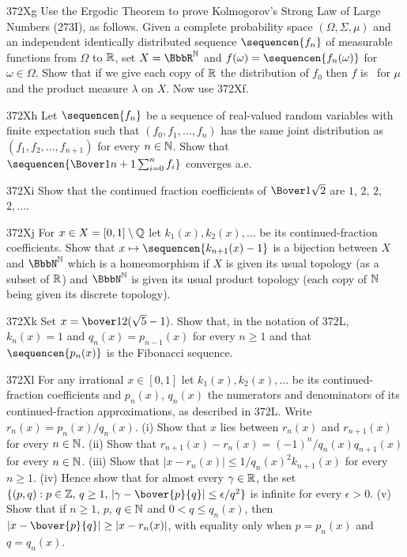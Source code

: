 {\sqheader 372Xg Use the Ergodic Theorem to prove Kolmogorov's Strong Law
of Large Numbers (273I), as follows.   Given a complete probability
space $(\Omega,\Sigma,\mu)$ and an independent identically distributed
sequence $\sequencen{f_n}$ of measurable functions from $\Omega$ to
$\Bbb R$, set $X=\BbbR^{\Bbb N}$ and
$f(\omega)=\sequencen{f_n(\omega)}$ for $\omega\in\Omega$.   Show that
if we give each copy of $\Bbb R$ the distribution of $f_0$ then $f$ is
\imp\ for $\mu$ and the product measure $\lambda$ on $X$.   Now use
372Xf.

\sqheader 372Xh Let
$\sequencen{f_n}$ be a sequence of real-valued random variables with finite
expectation such that
$(f_0,f_1,\ldots,f_n)$ has the same joint distribution as
$(f_1,f_2,\ldots,f_{n+1})$ for every $n\in\Bbb N$.   Show that
$\sequencen{\Bover1{n+1}\sum_{i=0}^nf_i}$ converges a.e.   

\spheader 372Xi Show that the continued fraction coefficients of
$\Bover1{\sqrt 2}$ are $1$, $2$, $2$, $2,\ldots$.

\sqheader 372Xj For $x\in X=[0,1]\setminus\Bbb Q$ let
$k_1(x),k_2(x),\ldots$ be its continued-fraction coefficients.
Show that $x\mapsto\sequencen{k_{n+1}(x)-1}$ is a bijection between $X$
and $\BbbN^{\Bbb N}$ which is a homeomorphism if $X$ is given its usual
topology (as a subset of $\Bbb R$) and $\BbbN^{\Bbb N}$ is given its
usual product topology (each copy of $\Bbb N$ being given its discrete
topology).

\spheader 372Xk Set $x=\bover12(\sqrt5-1)$.
Show that, in the notation of 372L, $k_n(x)=1$ and
$q_n(x)=p_{n-1}(x)$ for every $n\ge 1$ and that $\sequencen{p_n(x)}$ is the
Fibonacci sequence.

\spheader 372Xl For any irrational $x\in[0,1]$ let
$k_1(x),k_2(x),\ldots$ be its continued-fraction coefficients and
$p_n(x)$, $q_n(x)$ the numerators and denominators of its
continued-fraction approximations, as described in 372L.   Write
$r_n(x)=p_n(x)/q_n(x)$.   (i) Show that $x$ lies between $r_n(x)$ and
$r_{n+1}(x)$ for every $n\in\Bbb N$.   (ii) Show that
$r_{n+1}(x)-r_n(x)=(-1)^n/q_n(x)q_{n+1}(x)$ for every $n\in\Bbb N$.
(iii) Show that $|x-r_n(x)|\le 1/q_n(x)^2k_{n+1}(x)$ for every $n\ge 1$.
(iv) Hence show that for almost every $\gamma\in\Bbb R$, the set
$\{(p,q):p\in\Bbb Z,\,q\ge 1,\,|\gamma-\bover{p}{q}|\le\epsilon/q^2\}$
is infinite for every $\epsilon>0$.  (v) Show that if $n\ge 1$,
$p$, $q\in\Bbb N$ and $0<q\le q_n(x)$, then
$|x-\bover{p}{q}|\ge|x-r_n(x)|$, with equality only when $p=p_n(x)$ and
$q=q_n(x)$.

}
